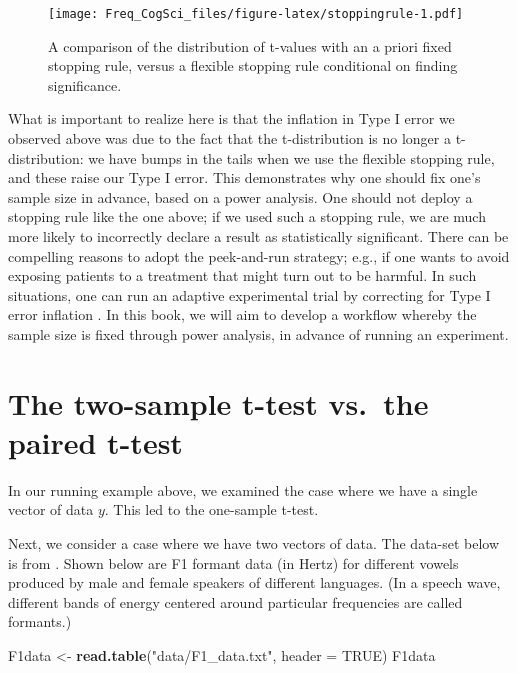 \documentclass[12pt,]{krantz}
\newenvironment{Shaded}{\begin{snugshade}}{\end{snugshade}}
\newcommand{\DataTypeTok}[1]{\textcolor[rgb]{0.13,0.29,0.53}{#1}}
\newcommand{\KeywordTok}[1]{\textcolor[rgb]{0.13,0.29,0.53}{\textbf{#1}}}
\newcommand{\NormalTok}[1]{#1}
\newcommand{\OtherTok}[1]{\textcolor[rgb]{0.56,0.35,0.01}{#1}}
\newcommand{\StringTok}[1]{\textcolor[rgb]{0.31,0.60,0.02}{#1}}
\begin{document}
\begin{figure}
\centering
\texttt{[image: Freq\_CogSci\_files/figure-latex/stoppingrule-1.pdf]}
\caption{\label{fig:stoppingrule}A comparison of the distribution of t-values with an a priori fixed stopping rule, versus a flexible stopping rule conditional on finding significance.}
\end{figure}

What is important to realize here is that the inflation in Type I error we observed above was due to the fact that the t-distribution is no longer a t-distribution: we have bumps in the tails when we use the flexible stopping rule, and these raise our Type I error. This demonstrates why one should fix one's sample size in advance, based on a power analysis. One should not deploy a stopping rule like the one above; if we used such a stopping rule, we are much more likely to incorrectly declare a result as statistically significant. There can be compelling reasons to adopt the peek-and-run strategy; e.g., if one wants to avoid exposing patients to a treatment that might turn out to be harmful. In such situations, one can run an adaptive experimental trial by correcting for Type I error inflation \citep{pocock2013clinical}. In this book, we will aim to develop a workflow whereby the sample size is fixed through power analysis, in advance of running an experiment.

\hypertarget{the-two-sample-t-test-vs.the-paired-t-test}{%
\section{The two-sample t-test vs.~the paired t-test}\label{the-two-sample-t-test-vs.the-paired-t-test}}

In our running example above, we examined the case where we have a single vector of data \(y\). This led to the one-sample t-test.

Next, we consider a case where we have two vectors of data. The data-set below is from \citet{johnson2011quantitative}. Shown below are F1 formant data (in Hertz) for different vowels produced by male and female speakers of different languages. (In a speech wave, different bands of energy centered around particular frequencies are called formants.)

\begin{Shaded}
\begin{Highlighting}[]
\NormalTok{F1data <-}\StringTok{ }\KeywordTok{read.table}\NormalTok{(}\StringTok{"data/F1_data.txt"}\NormalTok{, }\DataTypeTok{header =} \OtherTok{TRUE}\NormalTok{)}
\NormalTok{F1data}
\end{Highlighting}
\end{Shaded}
\end{document}
